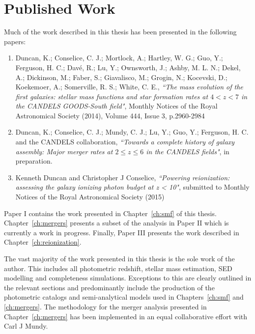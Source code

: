 %
%

\chapter*{Published Work}
Much of the work described in this thesis has been presented in the following papers:

\begin{enumerate}[I]
  \item Duncan, K.; Conselice, C. J.; Mortlock, A.; Hartley, W. G.; Guo, Y.; Ferguson, H. C.; Davé, R.; Lu, Y.; Ownsworth, J.; Ashby, M. L. N.; Dekel, A.; Dickinson, M.; Faber, S.; Giavalisco, M.; Grogin, N.; Kocevski, D.; Koekemoer, A.; Somerville, R. S.; White, C. E., \emph{``The mass evolution of the first galaxies: stellar mass functions and star formation rates at $4 < z < 7$ in the CANDELS GOODS-South field"}, Monthly Notices of the Royal Astronomical Society (2014), Volume 444, Issue 3, p.2960-2984
  
  \item Duncan, K.; Conselice, C. J.; Mundy, C. J.; Lu, Y.; Guo, Y.; Ferguson, H. C. and the CANDELS collaboration, \emph{``Towards a complete history of galaxy assembly: Major merger rates at $2 \leq z \leq 6$ in the CANDELS fields"}, in preparation.
  
  \item Kenneth Duncan and Christopher J Conselice, \emph{``Powering reionization: assessing the galaxy ionizing photon budget at z < 10"}, submitted to Monthly Notices of the Royal Astronomical Society (2015)
\end{enumerate}

Paper I contains the work presented in Chapter~\ref{ch:smf} of this thesis. Chapter~\ref{ch:mergers} presents a subset of the analysis in Paper II which is currently a work in progress. Finally, Paper III presents the work described in Chapter~\ref{ch:reionization}.

The vast majority of the work presented in this thesis is the sole work of the author. This includes all photometric redshift, stellar mass estimation, SED modelling and completeness simulations. Exceptions to this are clearly outlined in the relevant sections and predominantly include the production of the photometric catalogs and semi-analytical models used in Chapters~\ref{ch:smf} and \ref{ch:mergers}. The methodology for the merger analysis presented in Chapter~\ref{ch:mergers} has been implemented in an equal collaborative effort with Carl J Mundy.

\clearpage




